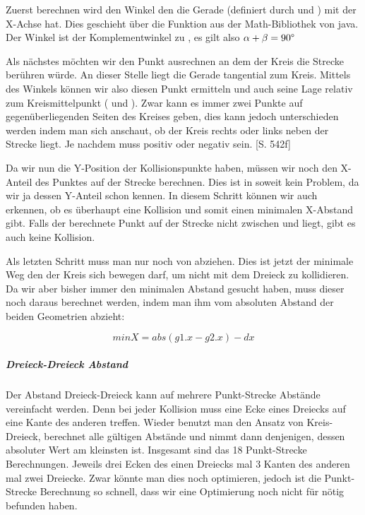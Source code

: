 
Zuerst berechnen wird den Winkel \textalpha den die Gerade (definiert durch  und ) mit der X-Achse hat. 
Dies geschieht über die Funktion  aus der Math-Bibliothek von java. 
Der Winkel \textbeta  ist der Komplementwinkel zu \textalpha, es gilt also $\alpha + \beta = 90\degree$


Als nächstes möchten wir den Punkt ausrechnen an dem der Kreis die Strecke berühren würde. An dieser Stelle liegt die Gerade tangential zum Kreis. Mittels des Winkels \textbeta  können wir also diesen Punkt ermitteln und auch seine Lage relativ zum Kreismittelpunkt ( und ).
Zwar kann es immer zwei Punkte auf gegenüberliegenden Seiten des Kreises geben, dies kann jedoch unterschieden werden indem man sich anschaut, ob der Kreis rechts oder links neben der Strecke liegt. Je nachdem muss  positiv oder negativ sein. \cite{EMFGAIA}[S. 542f]


Da wir nun die Y-Position der Kollisionspunkte haben, müssen wir noch den X-Anteil des Punktes auf der Strecke berechnen. Dies ist in soweit kein Problem, da wir ja dessen Y-Anteil schon kennen. In diesem Schritt können wir auch erkennen, ob es überhaupt eine Kollision und somit einen minimalen X-Abstand gibt. Falls der berechnete Punkt auf der Strecke nicht zwischen  und  liegt, gibt es auch keine Kollision.


Als letzten Schritt muss man nur noch  von  abziehen. Dies ist jetzt der minimale Weg den der Kreis sich bewegen darf, um nicht mit dem Dreieck zu kollidieren. Da wir aber bisher immer den minimalen Abstand gesucht haben, muss dieser noch daraus berechnet werden, indem man ihm vom absoluten Abstand der beiden Geometrien abzieht:

$$minX = abs(g1.x - g2.x) - dx$$

\subparagraph{Dreieck-Dreieck Abstand}

Der Abstand Dreieck-Dreieck kann auf mehrere Punkt-Strecke Abstände vereinfacht werden. Denn bei jeder Kollision muss eine Ecke eines Dreiecks auf eine Kante des anderen treffen. Wieder benutzt man den Ansatz von Kreis-Dreieck, berechnet alle gültigen Abstände und nimmt dann denjenigen, dessen absoluter Wert am kleinsten ist. Insgesamt sind das 18 Punkt-Strecke Berechnungen. Jeweils drei Ecken des einen Dreiecks mal 3 Kanten des anderen mal zwei Dreiecke. Zwar könnte man dies noch optimieren, jedoch ist die Punkt-Strecke Berechnung so schnell, dass wir eine Optimierung noch nicht für nötig befunden haben.

